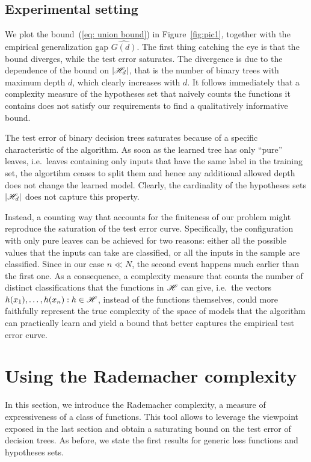 \documentclass[reqno]{amsart}
\let\oldsection\section
\renewcommand{\section}{\clearpage\thispagestyle{plain}\oldsection}
\begin{document}
\subsection{Experimental setting}

 

We plot the bound~(\ref{eq: union bound}) in Figure~\ref{fig:pic1}, together with the empirical generalization gap $\hat{G(d)}$. The first thing catching the eye is that the bound diverges, while the test error saturates. The divergence is due to the dependence of the bound on $\vert\mathscr{H}_d\vert$, that is the number of binary trees with maximum depth $d$, which clearly increases with $d$. It follows immediately that a complexity measure of the hypotheses set that naively counts the functions it contains does not satisfy our requirements to find a qualitatively informative bound.

The test error of binary decision trees saturates because of a specific characteristic of the algorithm. As soon as the learned tree has only ``pure'' leaves, i.e.\ leaves containing only inputs that have the same label in the training set, the algortihm ceases to split them and hence any additional allowed depth does not change the learned model. Clearly, the cardinality of the hypotheses sets $\vert\mathscr{H}_d\vert$ does not capture this property. 

Instead, a counting way that accounts for the finiteness of our problem might reproduce the saturation of the test error curve. Specifically, the configuration with only pure leaves can be achieved for two reasons: either all the possible values that the inputs can take are classified, or all the inputs in the sample are classified. Since in our case $n\ll N$, the second event happens much earlier than the first one. As a consequence, a complexity measure that counts the number of distinct classifications that the functions in $\mathscr{H}$ can give, i.e.\ the vectors $h(x_1),\ldots,h(x_n) : h\in \mathscr{H}$, instead of the functions themselves, could more faithfully represent the true complexity of the space of models that the algorithm can practically learn and yield a bound that better captures the empirical test error curve.

\newpage
\section{Using the Rademacher complexity}\label{sec: rademmassart}
In this section, we introduce the Rademacher complexity, a measure of expressiveness of a class of functions. This tool allows to leverage the viewpoint exposed in the last section and obtain a saturating bound on the test error of decision trees. As before, we state the first results for generic loss functions and hypotheses sets.  
\end{document}
